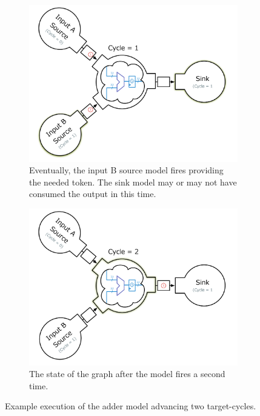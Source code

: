 \begin{figure}
    \begin{subfigure}[t]{0.45\textwidth}
	    \centering
        \includegraphics[width=\linewidth]{figures/adder-ex3.pdf}
        \caption{Eventually, the input B source model fires providing the needed token. The sink model may or
        may not have consumed the output in this time.}
    \end{subfigure}\hspace{0.1\linewidth}
    \begin{subfigure}[t]{0.45\textwidth}
	    \centering
        \includegraphics[width=\linewidth]{figures/adder-ex4.pdf}
        \caption{The state of the graph after the model fires a second time.}
    \end{subfigure}
    \caption{Example execution of the adder model advancing two target-cycles.}
    \label{fig:adder-execution}
\end{figure}

